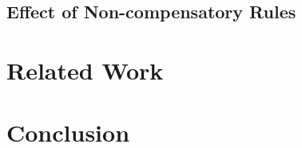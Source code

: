 \documentclass[letterpaper]{article} %
\begin{document}
\subsection{Effect of Non-compensatory Rules}

\section{Related Work}\label{sec:relatedwork}

\section{Conclusion}\label{sec:conclusion}




\end{document}
